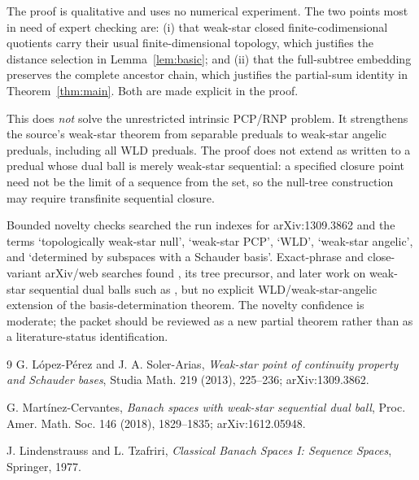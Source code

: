 \documentclass[11pt]{article}
\begin{document}
The proof is qualitative and uses no numerical experiment.  The two points
most in need of expert checking are: (i) that weak-star closed
finite-codimensional quotients carry their usual finite-dimensional topology,
which justifies the distance selection in Lemma~\ref{lem:basic}; and (ii) that
the full-subtree embedding preserves the complete ancestor chain, which
justifies the partial-sum identity in Theorem~\ref{thm:main}.  Both are made
explicit in the proof.

This does \emph{not} solve the unrestricted intrinsic PCP/RNP problem.  It
strengthens the source's weak-star theorem from separable preduals to
weak-star angelic preduals, including all WLD preduals.  The proof does not
extend as written to a predual whose dual ball is merely weak-star sequential:
a specified closure point need not be the limit of a sequence from the set,
so the null-tree construction may require transfinite sequential closure.

Bounded novelty checks searched the run indexes for arXiv:1309.3862 and the
terms `topologically weak-star null', `weak-star PCP', `WLD', `weak-star
angelic', and `determined by subspaces with a Schauder basis'.  Exact-phrase
and close-variant arXiv/web searches found \cite{LPS}, its tree precursor, and
later work on weak-star sequential dual balls such as \cite{MC}, but no
explicit WLD/weak-star-angelic extension of the basis-determination theorem.
The novelty confidence is moderate; the packet should be reviewed as a new
partial theorem rather than as a literature-status identification.

\begin{thebibliography}{9}
G. L\'opez-P\'erez and J. A. Soler-Arias,
\emph{Weak-star point of continuity property and Schauder bases},
Studia Math. 219 (2013), 225--236; arXiv:1309.3862.

G. Mart\'inez-Cervantes,
\emph{Banach spaces with weak-star sequential dual ball},
Proc. Amer. Math. Soc. 146 (2018), 1829--1835; arXiv:1612.05948.

J. Lindenstrauss and L. Tzafriri,
\emph{Classical Banach Spaces I: Sequence Spaces},
Springer, 1977.
\end{thebibliography}
\end{document}
